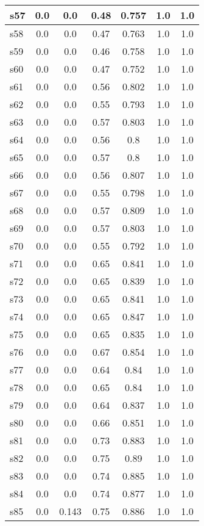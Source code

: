 \documentclass{article}
\begin{document}
\begin{tabular}{|l|c|c|c|c|c|c|}
\hline
s57 &0.0 & 0.0 & 0.48 & 0.757 & 1.0 & 1.0\\
\hline
s58 &0.0 & 0.0 & 0.47 & 0.763 & 1.0 & 1.0\\
\hline
s59 &0.0 & 0.0 & 0.46 & 0.758 & 1.0 & 1.0\\
\hline
s60 &0.0 & 0.0 & 0.47 & 0.752 & 1.0 & 1.0\\
\hline
s61 &0.0 & 0.0 & 0.56 & 0.802 & 1.0 & 1.0\\
\hline
s62 &0.0 & 0.0 & 0.55 & 0.793 & 1.0 & 1.0\\
\hline
s63 &0.0 & 0.0 & 0.57 & 0.803 & 1.0 & 1.0\\
\hline
s64 &0.0 & 0.0 & 0.56 & 0.8 & 1.0 & 1.0\\
\hline
s65 &0.0 & 0.0 & 0.57 & 0.8 & 1.0 & 1.0\\
\hline
s66 &0.0 & 0.0 & 0.56 & 0.807 & 1.0 & 1.0\\
\hline
s67 &0.0 & 0.0 & 0.55 & 0.798 & 1.0 & 1.0\\
\hline
s68 &0.0 & 0.0 & 0.57 & 0.809 & 1.0 & 1.0\\
\hline
s69 &0.0 & 0.0 & 0.57 & 0.803 & 1.0 & 1.0\\
\hline
s70 &0.0 & 0.0 & 0.55 & 0.792 & 1.0 & 1.0\\
\hline
s71 &0.0 & 0.0 & 0.65 & 0.841 & 1.0 & 1.0\\
\hline
s72 &0.0 & 0.0 & 0.65 & 0.839 & 1.0 & 1.0\\
\hline
s73 &0.0 & 0.0 & 0.65 & 0.841 & 1.0 & 1.0\\
\hline
s74 &0.0 & 0.0 & 0.65 & 0.847 & 1.0 & 1.0\\
\hline
s75 &0.0 & 0.0 & 0.65 & 0.835 & 1.0 & 1.0\\
\hline
s76 &0.0 & 0.0 & 0.67 & 0.854 & 1.0 & 1.0\\
\hline
s77 &0.0 & 0.0 & 0.64 & 0.84 & 1.0 & 1.0\\
\hline
s78 &0.0 & 0.0 & 0.65 & 0.84 & 1.0 & 1.0\\
\hline
s79 &0.0 & 0.0 & 0.64 & 0.837 & 1.0 & 1.0\\
\hline
s80 &0.0 & 0.0 & 0.66 & 0.851 & 1.0 & 1.0\\
\hline
s81 &0.0 & 0.0 & 0.73 & 0.883 & 1.0 & 1.0\\
\hline
s82 &0.0 & 0.0 & 0.75 & 0.89 & 1.0 & 1.0\\
\hline
s83 &0.0 & 0.0 & 0.74 & 0.885 & 1.0 & 1.0\\
\hline
s84 &0.0 & 0.0 & 0.74 & 0.877 & 1.0 & 1.0\\
\hline
s85 &0.0 & 0.143 & 0.75 & 0.886 & 1.0 & 1.0\\

\end{tabular}
\end{document}
